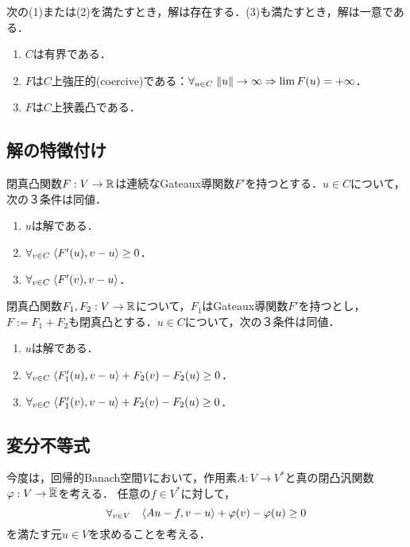 \documentclass[uplatex,dvipdfmx]{jsreport}
\begin{document}
\begin{proposition}
    次の(1)または(2)を満たすとき，解は存在する．(3)も満たすとき，解は一意である．
    \begin{enumerate}
        \item $C$は有界である．
        \item $F$は$C$上強圧的(coercive)である：$\forall_{u\in C}\;\|u\|\to\infty\Rightarrow\lim F(u)=+\infty$．
        \item $F$は$C$上狭義凸である．
    \end{enumerate}
\end{proposition}

\subsection{解の特徴付け}

\begin{proposition}
    閉真凸関数$F:V\to\mathbb{R}$は連続なGateaux導関数$F'$を持つとする．$u\in C$について，次の３条件は同値．
    \begin{enumerate}
        \item $u$は解である．
        \item $\forall_{v\in C}\;\langle F'(u),v-u\rangle\ge0$．
        \item $\forall_{v\in C}\;\langle F'(v),v-u\rangle$．
    \end{enumerate}
\end{proposition}

\begin{proposition}
    閉真凸関数$F_1,F_2:V\to\mathbb{R}$について，$F_1$はGateaux導関数$F'$を持つとし，$F:=F_1+F_2$も閉真凸とする．$u\in C$について，次の３条件は同値．
    \begin{enumerate}
        \item $u$は解である．
        \item $\forall_{v\in C}\;\langle F'_1(u),v-u\rangle+F_2(v)-F_2(u)\ge0$．
        \item $\forall_{v\in C}\;\langle F'_1(v),v-u\rangle+F_2(v)-F_2(u)\ge0$．
    \end{enumerate}
\end{proposition}

\subsection{変分不等式}

\begin{problem}
    今度は，回帰的Banach空間$V$において，作用素$A:V\to V^*$と真の閉凸汎関数$\varphi:V\to\overline{\mathbb{R}}$を考える．
    任意の$f\in V^*$に対して，
    \[\forall_{v\in V}\quad\langle Au-f,v-u\rangle+\varphi(v)-\varphi(u)\ge0\]
    を満たす元$u\in V$を求めることを考える．
\end{problem}
\end{document}

